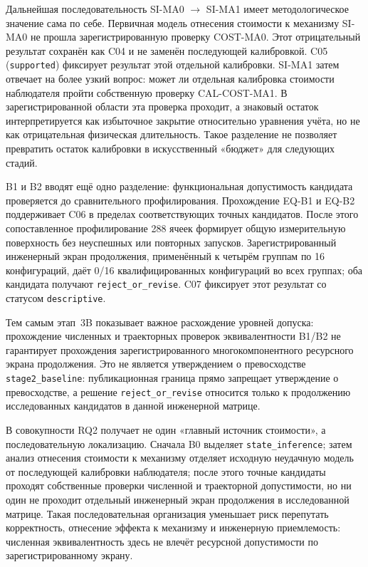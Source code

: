 Дальнейшая последовательность SI-MA0 \(\rightarrow\) SI-MA1 имеет
методологическое значение сама по себе. Первичная модель отнесения стоимости к
механизму SI-MA0 не прошла зарегистрированную проверку COST-MA0. Этот
отрицательный результат сохранён как C04 и не заменён последующей калибровкой.
C05 (\texttt{supported}) фиксирует результат этой отдельной калибровки.
SI-MA1 затем отвечает на более узкий вопрос: может ли отдельная калибровка
стоимости наблюдателя пройти собственную проверку CAL-COST-MA1. В
зарегистрированной области эта проверка проходит, а знаковый остаток
интерпретируется как избыточное закрытие относительно уравнения учёта, но не
как отрицательная физическая длительность. Такое разделение не позволяет
превратить остаток калибровки в искусственный «бюджет» для следующих стадий.

B1 и B2 вводят ещё одно разделение: функциональная допустимость кандидата
проверяется до сравнительного профилирования. Прохождение EQ-B1 и EQ-B2
поддерживает C06 в пределах соответствующих точных кандидатов. После этого
сопоставленное профилирование 288 ячеек формирует общую измерительную
поверхность без неуспешных или повторных запусков. Зарегистрированный
инженерный экран продолжения, применённый к четырём группам по 16 конфигураций,
даёт 0/16 квалифицированных конфигураций во всех группах; оба кандидата получают
\texttt{reject\_or\_revise}. C07 фиксирует этот результат со статусом
\texttt{descriptive}.

Тем самым этап~3B показывает важное расхождение уровней допуска: прохождение
численных и траекторных проверок эквивалентности B1/B2 не гарантирует
прохождения зарегистрированного многокомпонентного ресурсного экрана
продолжения. Это не является утверждением о превосходстве
\texttt{stage2\_baseline}: публикационная граница прямо запрещает утверждение о
превосходстве, а решение \texttt{reject\_or\_revise} относится только к продолжению
исследованных кандидатов в данной инженерной матрице.

В совокупности RQ2 получает не один «главный источник стоимости», а
последовательную локализацию. Сначала B0 выделяет
\texttt{state\_inference}; затем анализ отнесения стоимости к механизму отделяет
исходную неудачную модель от последующей калибровки наблюдателя; после этого
точные кандидаты проходят собственные проверки численной и траекторной
допустимости, но ни один не проходит отдельный инженерный экран продолжения в
исследованной матрице. Такая последовательная организация уменьшает риск
перепутать корректность, отнесение эффекта к механизму и инженерную
приемлемость: численная эквивалентность здесь не влечёт ресурсной допустимости
по зарегистрированному экрану.

